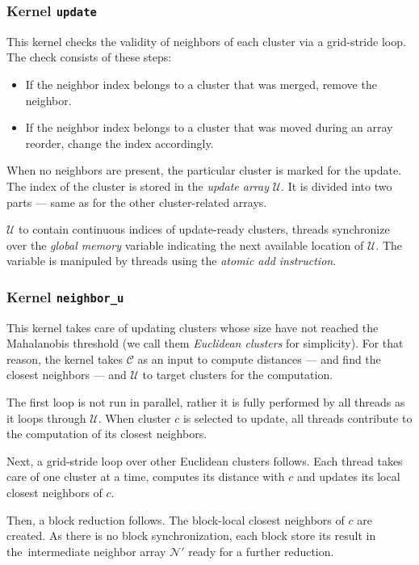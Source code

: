 \subsubsection{Kernel \texttt{update}}
This kernel checks the validity of neighbors of each cluster via a grid-stride loop. The check consists of these steps:
\begin{itemize}
	\item If the neighbor index belongs to a cluster that was merged, remove the neighbor.
	\item If the neighbor index belongs to a cluster that was moved during an array reorder, change the index accordingly.
\end{itemize} 
When no neighbors are present, the particular cluster is marked for the update. The index of the cluster is stored in the \emph{update array} $\mathcal{U}$. It is divided into two parts --- same as for the other cluster-related arrays. 

$\mathcal{U}$ to contain continuous indices of update-ready clusters, threads synchronize over the \emph{global memory} variable indicating the next available location of $\mathcal{U}$. The variable is manipuled by threads using the \emph{atomic add instruction}.

\subsubsection{Kernel \texttt{neighbor\_u}}

This kernel takes care of updating clusters whose size have not reached the Mahalanobis threshold (we call them \emph{Euclidean clusters} for simplicity). For that reason, the kernel takes $\mathcal{C}$ as an input to compute distances --- and find the closest neighbors --- and $\mathcal{U}$ to target clusters for the computation.

The first loop is not run in parallel, rather it is fully performed by all threads as it loops through $\mathcal{U}$. When cluster $c$ is selected to update, all threads contribute to the computation of its closest neighbors.

Next, a grid-stride loop over other Euclidean clusters follows. Each thread takes care of one cluster at a time, computes its distance with $c$ and updates its local closest neighbors of $c$.

Then, a block reduction follows. The block-local closest neighbors of $c$ are created. As there is no block synchronization, each block store its result in the~intermediate neighbor array $\mathcal{N}'$ ready for a further reduction.

